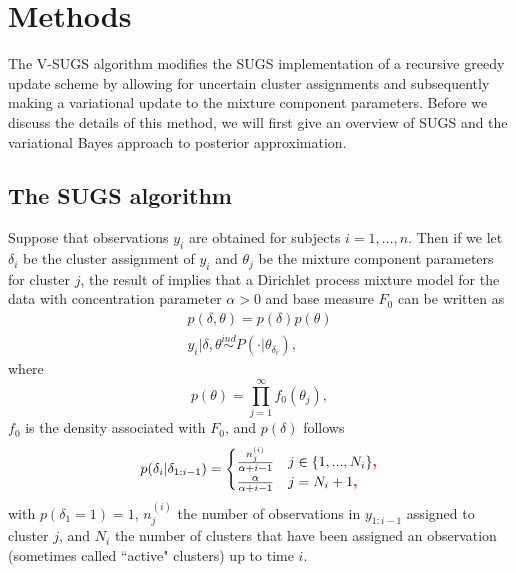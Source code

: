 \documentclass{uwstat572}
\newcommand{\vmadd}[1]{\textbf{\color{red}{#1}}}
\begin{document}
\section{Methods}

The V-SUGS algorithm modifies the SUGS implementation of a recursive greedy update scheme by allowing for uncertain cluster assignments and subsequently making a variational update to the mixture component parameters. Before we discuss the details of this method, we will first give an overview of SUGS and the variational Bayes approach to posterior approximation.

\subsection{The SUGS algorithm}

Suppose that observations $y_i$ are obtained for subjects $i = 1,..., n$. Then if we let $\delta_i$ be the cluster assignment of $y_i$ and $\theta_j$ be the mixture component parameters for cluster $j$, the result of \cite{lo} implies that a Dirichlet process mixture model for the data with concentration parameter $\alpha >  0$ and base measure $F_0$ can be written as 
\begin{align}
p(\delta,\theta) = p(\delta)p(\theta) \nonumber \\
y_i | \delta, \theta \overset{ind}{\sim} P(\cdot | \theta_{\delta_i}), \nonumber
\end{align}
where
$$ p(\theta) = \prod_{j=1}^\infty f_0(\theta_j),$$
$f_0$ is the density associated with $F_0$, and $p(\delta)$ follows 
\[ p(\delta_i | \delta_{1:i-1}) = \begin{cases} 
      \frac{n_j^{(i)}}{\alpha+i-1}& j \in \{1,...,N_i\}\vmadd{,} \\
      \frac{\alpha}{\alpha+i-1} & j = N_i +1\vmadd{,}
   \end{cases}
\]
with $p(\delta_1 = 1) = 1$, $n_j^{(i)}$ the number of observations in $y_{1:i-1}$ assigned to cluster $j$, and $N_i$ the number of clusters that have been assigned an observation (sometimes called ``active" clusters) up to time $i$.
\end{document}
